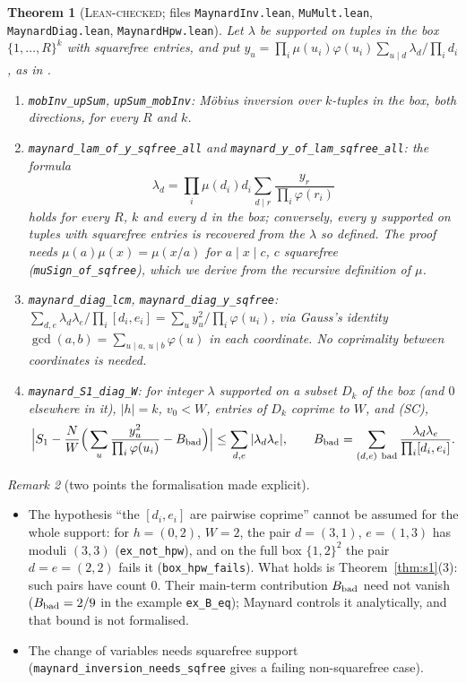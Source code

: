 \documentclass[11pt]{amsart}
\newtheorem{theorem}{Theorem}
\theoremstyle{definition}
\theoremstyle{remark}
\newtheorem{remark}[theorem]{Remark}
\newcommand{\lbl}[1]{\textup{\textsc{#1}}}
\newcommand{\tl}[1]{\texttt{#1}}
\begin{document}
\begin{theorem}[\lbl{Lean-checked}; files \tl{MaynardInv.lean}, \tl{MuMult.lean}, \tl{MaynardDiag.lean}, \tl{MaynardHpw.lean}]\label{thm:diag}
Let $\lambda$ be supported on tuples in the box $\{1,\dots,R\}^k$ with
squarefree entries, and put
$y_u=\prod_i\mu(u_i)\varphi(u_i)\sum_{u\mid d}\lambda_d/\prod_id_i$, as in
\cite[Lemma~5.1]{May15}.
\begin{enumerate}
\item \tl{mobInv\_upSum}, \tl{upSum\_mobInv}: M\"obius inversion over
$k$-tuples in the box, both directions, for every $R$ and $k$.
\item \tl{maynard\_lam\_of\_y\_sqfree\_all} and
\tl{maynard\_y\_of\_lam\_sqfree\_all}: the formula
\[\lambda_d=\prod_i\mu(d_i)d_i\sum_{d\mid r}\frac{y_r}{\prod_i\varphi(r_i)}\]
holds for every $R$, $k$ and every $d$ in the box; conversely, every $y$
supported on tuples with squarefree entries is recovered from the $\lambda$ so
defined. The proof needs $\mu(a)\mu(x)=\mu(x/a)$ for
$a\mid x\mid c$, $c$ squarefree (\tl{muSign\_of\_sqfree}), which we derive from
the recursive definition of $\mu$.
\item \tl{maynard\_diag\_lcm}, \tl{maynard\_diag\_y\_sqfree}:
$\sum_{d,e}\lambda_d\lambda_e/\prod_i[d_i,e_i]=\sum_u y_u^2/\prod_i\varphi(u_i)$,
via Gauss's identity $\gcd(a,b)=\sum_{u\mid a,\,u\mid b}\varphi(u)$ in each
coordinate. No coprimality between coordinates is needed.
\item \tl{maynard\_S1\_diag\_W}: for integer $\lambda$ supported on a subset $D_k$ of
the box (and $0$ elsewhere in it), $|h|=k$, $v_0<W$, entries of $D_k$ coprime to $W$, and (SC),
\[
\Big|S_1-\frac NW\Big(\sum_{u}\frac{y_u^2}{\prod_i\varphi(u_i)}-B_{\rm bad}\Big)\Big|
\le\sum_{d,e}|\lambda_d\lambda_e|,\qquad
B_{\rm bad}=\sum_{(d,e)\ \mathrm{bad}}\frac{\lambda_d\lambda_e}{\prod_i[d_i,e_i]}.
\]
\end{enumerate}
\end{theorem}

\begin{remark}[two points the formalisation made explicit]
\begin{itemize}
\item The hypothesis ``the $[d_i,e_i]$ are pairwise coprime'' cannot be assumed
for the whole support: for $h=(0,2)$, $W=2$, the pair $d=(3,1)$, $e=(1,3)$ has
moduli $(3,3)$ (\tl{ex\_not\_hpw}), and on the full box $\{1,2\}^2$ the pair
$d=e=(2,2)$ fails it (\tl{box\_hpw\_fails}). What holds is Theorem~\ref{thm:s1}(3): such
pairs have count $0$. Their main-term contribution $B_{\rm bad}$ need not vanish
($B_{\rm bad}=2/9$ in the example \tl{ex\_B\_eq}); Maynard controls it analytically, and
that bound is not formalised.
\item The change of variables needs squarefree support
(\tl{maynard\_inversion\_needs\_sqfree} gives a failing non-squarefree case).
\end{itemize}
\end{remark}
\end{document}
